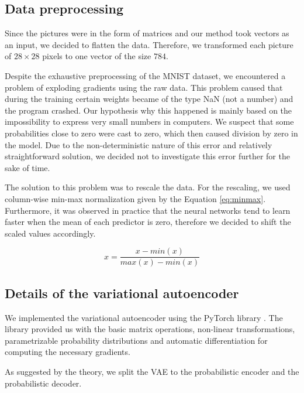 \subsection{Data preprocessing}
Since the pictures were in the form of matrices and our method took vectors as an input, we decided to flatten the data.
Therefore, we transformed each picture of $28\times28$ pixels to one vector of the size $784$.

Despite the exhaustive preprocessing of the MNIST dataset, we encountered a problem of exploding gradients using the raw data.
This problem caused that during the training certain weights became of the type NaN (not a number) and the program crashed.
Our hypothesis why this happened is mainly based on the impossibility to express very small numbers in computers.
We suspect that some probabilities close to zero were cast to zero, which then caused division by zero in the model.
Due to the non-deterministic nature of this error and relatively straightforward solution, we decided not to investigate this error further for the sake of time.

The solution to this problem was to rescale the data.
For the rescaling, we used column-wise min-max normalization given by the Equation \ref{eq:minmax}.
Furthermore, it was observed in practice that the neural networks tend to learn faster when the mean of each predictor is zero, therefore we decided to shift the scaled values accordingly. 

\begin{equation}
    x = \frac{x - min(x)}{max(x) - min(x)}
    \label{eq:minmax}
\end{equation}


\subsection{Details of the variational autoencoder}
We implemented the variational autoencoder using the PyTorch library \cite{paszke2017automatic}.
The library provided us with the basic matrix operations, non-linear transformations, parametrizable probability distributions and automatic differentiation for computing the necessary gradients.

As suggested by the theory, we split the VAE to the probabilistic encoder and the probabilistic decoder.


